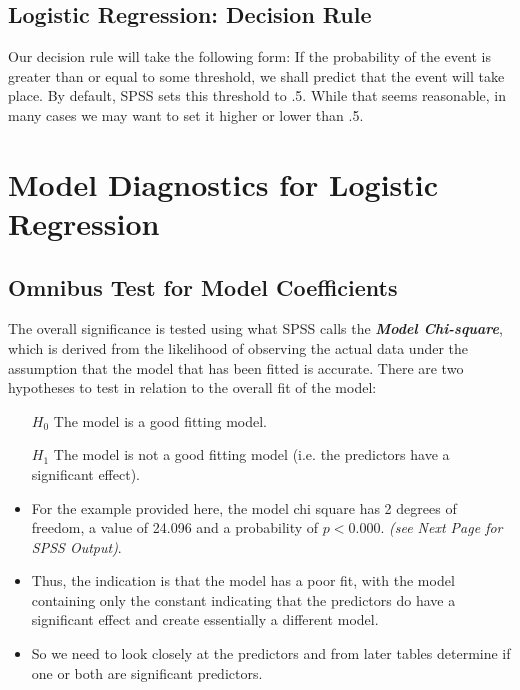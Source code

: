 \documentclass[a4paper,12pt]{article}
\begin{document}
\subsection{Logistic Regression: Decision Rule}
Our decision rule will take the following form: If the probability of the event is greater than or equal to some threshold, we shall predict that the event will take place. By default, SPSS sets this threshold to .5. While that seems reasonable, in many cases we may want to set it higher or lower than .5.


\section{Model Diagnostics for Logistic Regression}


\subsection{Omnibus Test for Model Coefficients}
The overall significance is tested using what SPSS calls the \textbf{\textit{Model Chi-square}}, which is derived from the likelihood of observing the actual data under the assumption that the model that has been fitted is accurate. There are two hypotheses to test in relation to the overall fit of the model:

\begin{framed}
	\begin{itemize}
		\item[$H_0$] The model is a good fitting model.
		\item[$H_1$] The model is not a good fitting model (i.e. the predictors have a significant effect).
	\end{itemize}
\end{framed}

\begin{itemize}
	\item For the example provided here, the model chi square has 2 degrees of freedom, a value of 24.096 and a probability of $p < 0.000$. \textit{(see Next Page for SPSS Output)}.
	
	\item Thus, the indication is that the model has a poor fit, with the model containing only the constant indicating that the predictors do have a significant effect and create essentially a different model. 
	\item So we need to look closely at
	the predictors and from later tables determine if one or both are significant predictors.
\end{itemize}
\bigskip
\end{document}
